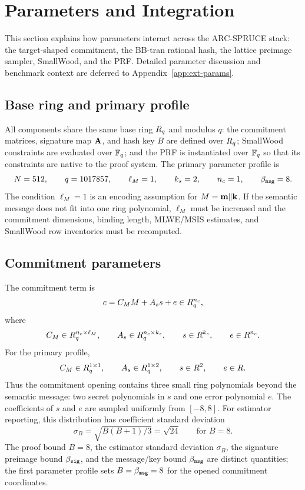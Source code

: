 \section{Parameters and Integration}
\label{sec:parameters}

This section explains how parameters interact across the ARC-SPRUCE stack: the target-shaped commitment, the
BB-tran rational hash, the lattice preimage sampler, SmallWood, and the PRF.  Detailed parameter discussion and
benchmark context are deferred to Appendix~\ref{app:ext-params}.

\subsection{Base ring and primary profile}
All components share the same base ring \(R_q\) and modulus \(q\): the commitment matrices, signature map
\(\mathbf{A}\), and hash key \(B\) are defined over \(R_q\); SmallWood constraints are evaluated over \(\mathbb{F}_q\); and the PRF
is instantiated over \(\mathbb{F}_q\) so that its constraints are native to the proof system.  The primary parameter profile is
\[
  N=512,
  \qquad
  q=1017857,
  \qquad
  \ell_M=1,
  \qquad
  k_s=2,
  \qquad
  n_c=1,
  \qquad
  \beta_{\mathtt{msg}}=8.
\]
The condition \(\ell_M=1\) is an encoding assumption for \(M=\mathbf{m}\Vert\mathbf{k}\).  If the semantic message does not
fit into one ring polynomial, \(\ell_M\) must be increased and the commitment dimensions, binding length, MLWE/MSIS
estimates, and SmallWood row inventories must be recomputed.

\subsection{Commitment parameters}
The commitment term is
\[
  c=C_MM+A_s s+e\in R_q^{n_c},
\]
where
\[
  C_M\in R_q^{n_c\times \ell_M},
  \qquad
  A_s\in R_q^{n_c\times k_s},
  \qquad
  s\in R^{k_s},
  \qquad
  e\in R^{n_c}.
\]
For the primary profile,
\[
  C_M\in R_q^{1\times1},
  \qquad
  A_s\in R_q^{1\times2},
  \qquad
  s\in R^2,
  \qquad
  e\in R.
\]
Thus the commitment opening contains three small ring polynomials beyond the semantic message: two secret
polynomials in \(s\) and one error polynomial \(e\).  The coefficients of \(s\) and \(e\) are sampled uniformly from
\([-8,8]\).  For estimator reporting, this distribution has coefficient standard deviation
\[
  \sigma_B=\sqrt{B(B+1)/3}=\sqrt{24}
  \qquad\text{for }B=8.
\]
The proof bound \(B=8\), the estimator standard deviation \(\sigma_B\), the signature preimage bound \(\beta_{\mathtt{sig}}\),
and the message/key bound \(\beta_{\mathtt{msg}}\) are distinct quantities; the first parameter profile sets \(B=\beta_{\mathtt{msg}}=8\)
for the opened commitment coordinates.

